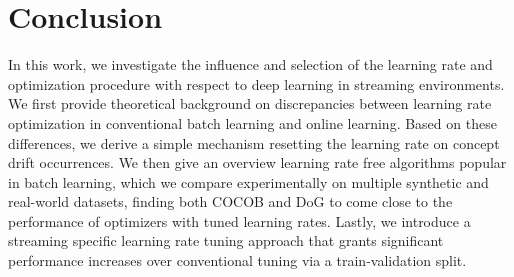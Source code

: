\documentclass[runningheads]{llncs}
\begin{document}
\section{Conclusion}

In this work, we investigate the influence and selection of the learning rate and optimization procedure with respect to deep learning in streaming environments.
We first provide theoretical background on discrepancies between learning rate optimization in conventional batch learning and online learning.
Based on these differences, we derive a simple mechanism resetting the learning rate on concept drift occurrences.
We then give an overview learning rate free algorithms popular in batch learning, which we compare experimentally on multiple synthetic and real-world datasets,
finding both COCOB and DoG to come close to the performance of optimizers with tuned learning rates.
Lastly, we introduce a streaming specific learning rate tuning approach that grants significant performance increases over conventional tuning via a train-validation split.


\printbibliography
\end{document}
